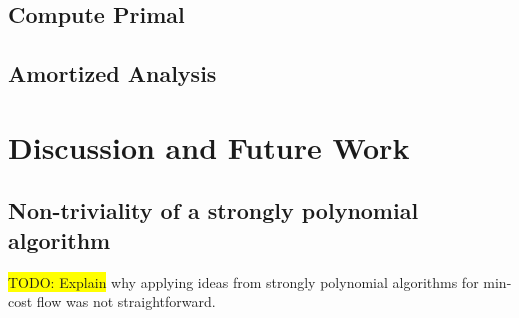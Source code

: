 \documentclass[12pt]{article}
\theoremstyle{definition}
\newcommand{\todo}[1]{\colorbox{yellow}{TODO: #1}}
\begin{document}
\subsection{Compute Primal}
\subsection{Amortized Analysis}





\section{Discussion and Future Work}

\subsection{Non-triviality of a strongly polynomial algorithm}

\todo{Explain} why applying ideas from strongly polynomial algorithms for
min-cost flow was not straightforward. 

\nocite{*}
\printbibliography
\end{document}
